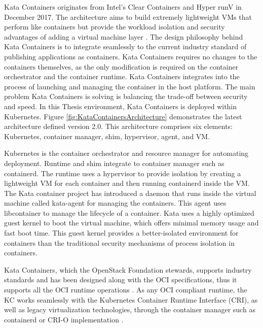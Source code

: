 Kata Containers originates from Intel's Clear Containers \cite{ClearContainers} and Hyper runV \cite{runV} in December 2017. The architecture aims to build extremely lightweight VMs that perform like containers but provide the workload isolation and security advantages of adding a virtual machine layer \cite{Randazzo2019}. The design philosophy behind Kata Containers is to integrate seamlessly to the current industry standard of publishing applications as containers. Kata Containers requires no changes to the containers themselves, as the only modification is required on the container orchestrator and the container runtime. Kata Containers integrates into the process of launching and managing the container in the host platform. The main problem Kata Containers is solving is balancing the trade-off between security and speed. In this Thesis environment, Kata Containers is deployed within Kubernetes. Figure \ref{fig:KataContainersArchitecture} demonstrates the latest architecture defined version 2.0. This architecture comprises six elements: Kubernetes, container manager, shim, hypervisor, agent, and VM.

Kubernetes is the container orchestrator and resource manager for automating deployment. Runtime and shim integrate to container manager such as containerd. The runtime uses a hypervisor to provide isolation by creating a lightweight VM for each container and then running containerd inside the VM. The Kata container project has introduced a daemon that runs inside the virtual machine called kata-agent for managing the containers. This agent uses libcontainer to manage the lifecycle of a container. Kata uses a highly optimized guest kernel to boot the virtual machine, which offers minimal memory usage and fast boot time. This guest kernel provides a better-isolated environment for containers than the traditional security mechanisms of process isolation in containers. \cite{Kumar2020}

Kata Containers, which the OpenStack Foundation stewards, supports industry standards and has been designed along with the OCI specifications, thus it supports all the OCI runtime operations \cite{Kumar2020}. As any OCI compliant runtime, the KC works seamlessly with the Kubernetes Container Runtime Interface (CRI)\cite{CRI}, as well as legacy virtualization technologies, through the container manager such as containerd or CRI-O implementation \cite{Randazzo2019}.

